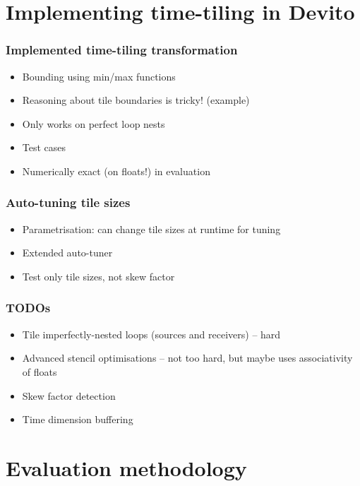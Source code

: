 \documentclass{beamer}
\begin{document}
\section{Implementing time-tiling in Devito}

\begin{frame}
\frametitle{Implemented time-tiling transformation}

\begin{itemize}
	\item Bounding using min/max functions
	\item Reasoning about tile boundaries is tricky! (example)
	\item Only works on perfect loop nests \Sadey
	\item Test cases
	\item Numerically exact (on floats!) in evaluation
\end{itemize}
\end{frame}



\begin{frame}
\frametitle{Auto-tuning tile sizes}

\begin{itemize}
	\item Parametrisation: can change tile sizes at runtime for tuning
	\item Extended auto-tuner
	\item Test only tile sizes, not skew factor
\end{itemize}
\end{frame}



\begin{frame}
\frametitle{TODOs}

\begin{itemize}
	\item Tile imperfectly-nested loops (sources and receivers) -- hard
	\item Advanced stencil optimisations -- not too hard, but maybe uses associativity of floats \Sadey
	\item Skew factor detection
	\item Time dimension buffering
\end{itemize}
\end{frame}



\section{Evaluation methodology}
\end{document}
